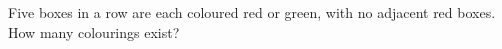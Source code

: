 Five boxes in a row are each coloured red or green, with no adjacent red boxes. How many colourings exist?
